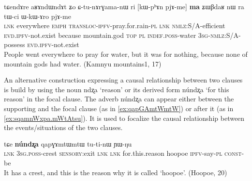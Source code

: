 \documentclass[oldfontcommands,oneside,a4paper,11pt]{article}
\newcommand{\ipa}[1]{{\phon \mbox{#1}}} %
\begin{document}
\begin{exe}
\ex \label{CtunArGamanW}
\gll 
\ipa{tɕendɤre}   	\ipa{aʁɤndɯndɤt}   	\ipa{ʑo}   	\ipa{ɕ-tu-nɤrɣama-nɯ}   	\ipa{ri}   	[\ipa{kɯ-pʰɤn}   	\ipa{pjɤ-me}]   	\ipa{\textbf{ma}}   	\ipa{ʑɯβdaʁ}   	\ipa{nɯ} \ipa{ra}   	\ipa{tɯ-ci}   	\ipa{ɯ-kɯ-ɤro}   	\ipa{pjɤ-me} \\
\textsc{lnk} everywhere \textsc{emph} \textsc{transloc-ipfv}-pray.for.rain-\textsc{pl} \textsc{lnk} \textsc{nmlz}:S/A-efficient \textsc{evd.ipfv}-not.exist because mountain.god \textsc{top} \textsc{pl} \textsc{indef.poss}-water \textsc{3sg-nmlz}:S/A-possess  \textsc{evd.ipfv}-not.exist  \\
 \glt People went everywhere to pray for water, but it was for nothing, because none of mountain gods had water. (Kamnyu mountains1, 17)
\end{exe}

An alternative construction expressing a causal relationship between two clauses  is build by using the  noun  \ipa{ndʐa} `reason' or its derived form \ipa{núndʐa} `for this reason' in the focal clause. The adverb \ipa{núndʐa} can appear either between the supporting and  the focal clause (as in \ref{ex:qapGAmtWmtW}) or after it (as in \ref{ex:sqamnWxpa.mWtAtsu}). It is used to focalize the causal relationship between the events/situations of the two clauses.  

\begin{exe}
\ex \label{ex:qapGAmtWmtW}
\gll
[\ipa{tɕe}  	\ipa{ɯ-mtɯ}  	\ipa{ɣɤʑu}]  	\ipa{tɕe,}  	\ipa{tɕe}  	\textbf{\ipa{núndʐa}}  	\ipa{qapɣɤmtɯmtɯ}  	\ipa{tu-ti-nɯ}  	\ipa{ɲɯ-ŋu}   \\
\textsc{lnk} \textsc{3sg.poss}-crest \textsc{sensory}:exit \textsc{lnk} \textsc{lnk} for.this.reason hoopoe \textsc{ipfv}-say-\textsc{pl} \textsc{const}-be \\
\glt It has a crest, and this is the reason why it is called `hoopoe'. (Hoopoe, 20)
\end{exe}
\end{document}
